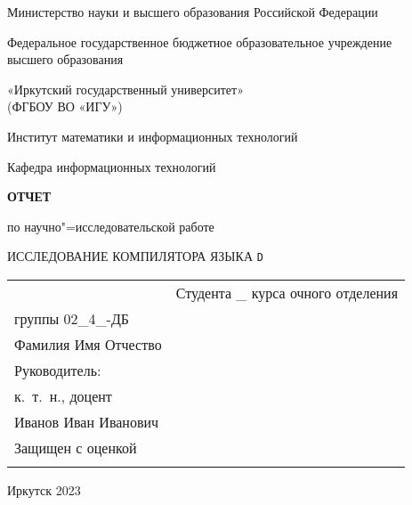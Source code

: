 \documentclass{studrep}
\begin{document}
\thispagestyle{empty}
\begin{center}
Министерство науки и высшего образования Российской Федерации

Федеральное государственное бюджетное образовательное учреждение\\ высшего образования

«Иркутский государственный университет»\\
(ФГБОУ ВО «ИГУ»)

Институт математики и информационных технологий

Кафедра информационных технологий
\end{center}

\vfill
\begin{center}
  \textbf{\large ОТЧЕТ}

  по научно"=исследовательской работе
\vspace{1em}



\vspace{2em}
ИССЛЕДОВАНИЕ КОМПИЛЯТОРА ЯЗЫКА \verb|D|

\end{center}
\vfill

\noindent\begin{tabularx}{\textwidth} {
  >{\raggedright\arraybackslash}X
  >{\raggedright}X }
&

Студента \_ курса очного отделения\\
группы 02\_4\_-ДБ\\
Фамилия Имя Отчество\\[2em]

Руководитель:\\
к.~т.~н., доцент\\
\underline{\hspace{3cm}} Иванов Иван Иванович\\[2em]

Защищен с оценкой\\[1em] \underline{\hspace{3cm}}

\end{tabularx}
\vfill
\begin{center}
  Иркутск 2023
\end{center}
\clearpage
\end{document}
